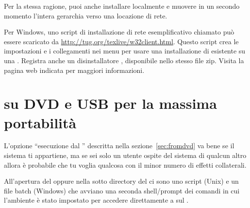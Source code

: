 \documentclass{article}
\begin{document}
Per la stessa ragione, puoi anche installare \TL{} localmente e muovere in
un secondo momento l'intera gerarchia verso una locazione di rete.

Per Windows, uno script di installazione di rete esemplificativo chiamato
 può essere scaricato da
\url{http://tug.org/texlive/w32client.html}. Questo script crea le
impostazioni e i collegamenti nei menu per usare una installazione di
\TL{} esistente su una . Registra anche un disinstallatore
, disponibile nello stesso file zip. Visita la
pagina web indicata per maggiori informazioni.


\section{\protect\TL{} su DVD e USB per la massima portabilità}
\label{sec:portable-tl}

L'opzione ``esecuzione dal \DVD{}'' descritta nella
sezione~\ref{sec:fromdvd} va bene se il sistema ti appartiene, ma se sei
solo un utente ospite del sistema di qualcun altro allora è probabile che
tu voglia qualcosa con il minor numero di effetti collaterali.

All'apertura del \DVD{} \TL{} oppure nella sotto directory
 del \DVD{} \TK{} ci sono uno script
 (Unix) e un file batch 
(Windows) che avviano una seconda shell\slash prompt dei comandi in cui
l'ambiente è stato impostato per accedere direttamente a \TL{} sul \DVD.
\end{document}
